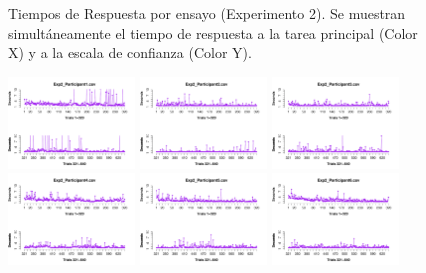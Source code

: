 \begin{figure}[th]
\caption[TRs_Exp2]{Tiempos de Respuesta por ensayo (Experimento 2). Se muestran simultáneamente el tiempo de respuesta a la tarea principal (Color X) y a la escala de confianza (Color Y).}
\label{fig:RTs_E2}
\end{figure}

\begin{figure}[th]
\centering
\includegraphics[width=0.30\textwidth]{Figures/RT1_Exp2_P1} \includegraphics[width=0.30\textwidth]{Figures/RT1_Exp2_P2} \includegraphics[width=0.30\textwidth]{Figures/RT1_Exp2_P3}
\includegraphics[width=0.30\textwidth]{Figures/RT1_Exp2_P4} \includegraphics[width=0.30\textwidth]{Figures/RT1_Exp2_P5} \includegraphics[width=0.30\textwidth]{Figures/RT1_Exp2_P6}

\end{figure}
